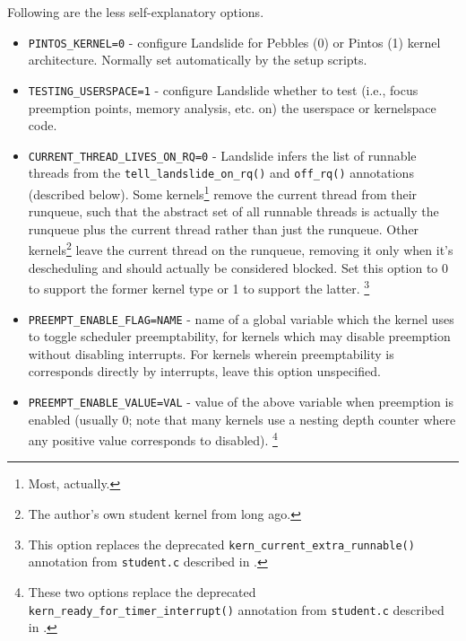 Following are the less self-explanatory options.
\begin{itemize}
	\item {\tt PINTOS\_KERNEL=0} - configure Landslide for Pebbles (0) or Pintos (1) kernel architecture. Normally set automatically by the setup scripts.
	\item {\tt TESTING\_USERSPACE=1} - configure Landslide whether to test (i.e., focus preemption points, memory analysis, etc. on) the userspace or kernelspace code.
	\item {\tt CURRENT\_THREAD\_LIVES\_ON\_RQ=0} - Landslide infers the list of runnable threads from the {\tt tell\_landslide\_on\_rq()} and {\tt off\_rq()} annotations (described below).
		Some kernels\footnote{Most, actually.} remove the current thread from their runqueue,
		such that the abstract set of all runnable threads is actually the runqueue plus the current thread rather than just the runqueue.
		Other kernels\footnote{The author's own student kernel from long ago.}
		leave the current thread on the runqueue,
		removing it only when it's descheduling and should actually be considered blocked.
		Set this option to 0 to support the former kernel type or 1 to support the latter.%
		\footnote{This option replaces the deprecated {\tt kern\_current\_extra\_runnable()} annotation from {\tt student.c} described in \cite[\S{}6.2.3]{landslide}.}
	\item {\tt PREEMPT\_ENABLE\_FLAG=NAME} - name of a global variable which the kernel uses to toggle scheduler preemptability, for kernels which may disable preemption without disabling interrupts.
		For kernels wherein preemptability is corresponds directly by interrupts, leave this option unspecified.
	\item {\tt PREEMPT\_ENABLE\_VALUE=VAL} - value of the above variable when preemption is enabled
		(usually 0; note that many kernels use a nesting depth counter where any positive value corresponds to disabled).%
		\footnote{These two options replace the deprecated {\tt kern\_ready\_for\_timer\_interrupt()} annotation from {\tt student.c} described in \cite{landslide} .}

\end{itemize}
